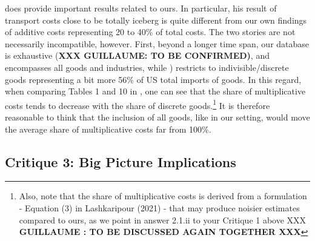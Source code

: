 \documentclass[a4paper,11pt]{article}
\begin{document}
\citet{Lashkaripour_JIE2020} does provide important results related to ours. In particular, his result of transport costs close to be totally iceberg is quite different from our own findings of additive costs representing 20 to 40\% of total costs. The two stories are not necessarily incompatible, however. First, beyond a longer time span, our database is exhaustive (\textbf{XXX GUILLAUME: TO BE CONFIRMED)}, and encompasses all goods and industries, while \citet{Lashkaripour_JIE2020}) restricts to indivisible/discrete goods representing a bit more 56\% of US total imports of goods. In this regard, when comparing Tables 1 and 10 in \citet{Lashkaripour_JIE2020}, one can see that the share of multiplicative costs tends to decrease with the share of discrete goods.\footnote{Also, note that the share of multiplicative costs is derived from a formulation - Equation (3) in Lashkaripour (2021) - that may produce noisier estimates compared to ours, as we point in answer 2.1.ii to your Critique 1 above XXX \textbf{GUILLAUME : TO BE DISCUSSED AGAIN TOGETHER XXX}} It is therefore reasonable to think that the inclusion of all goods, like in our setting, would move the average share of multiplicative costs far from 100\%.






\subsection{Critique 3: Big Picture Implications}
\end{document}
